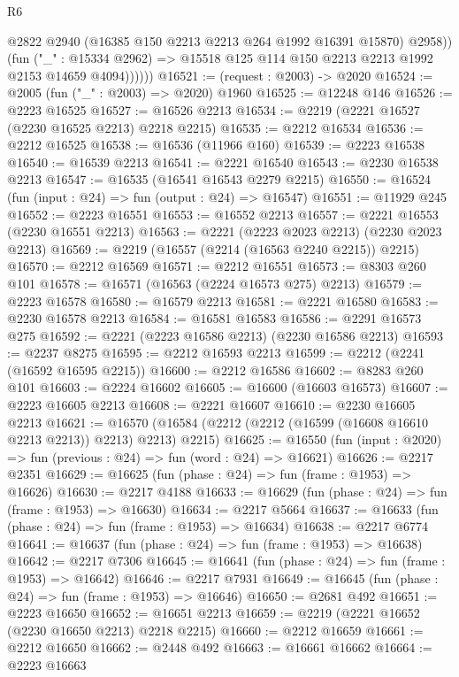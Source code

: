 \begin{lexlean}{R6}
\begin{coremodule}
                  @2822
                  @2940
                  (@16385 @150 @2213 @2213 @264 @1992 @16391 @15870)
                  @2958))
              (fun ("_" : @15334 @2962) =>
              @15518 @125 @114 @150 @2213 @2213 @1992 @2153 @14659 @4094))))))
@16521 := (request : @2003) -> @2020
@16524 := @2005 (fun ("_" : @2003) => @2020) @1960
@16525 := @12248 @146
@16526 := @2223 @16525
@16527 := @16526 @2213
@16534 := @2219 (@2221 @16527 (@2230 @16525 @2213) @2218 @2215)
@16535 := @2212 @16534
@16536 := @2212 @16525
@16538 := @16536 (@11966 @160)
@16539 := @2223 @16538
@16540 := @16539 @2213
@16541 := @2221 @16540
@16543 := @2230 @16538 @2213
@16547 := @16535 (@16541 @16543 @2279 @2215)
@16550 := @16524 (fun (input : @24) => fun (output : @24) => @16547)
@16551 := @11929 @245
@16552 := @2223 @16551
@16553 := @16552 @2213
@16557 := @2221 @16553 (@2230 @16551 @2213)
@16563 := @2221 (@2223 @2023 @2213) (@2230 @2023 @2213)
@16569 := @2219 (@16557 (@2214 (@16563 @2240 @2215)) @2215)
@16570 := @2212 @16569
@16571 := @2212 @16551
@16573 := @8303 @260 @101
@16578 := @16571 (@16563 (@2224 @16573 @275) @2213)
@16579 := @2223 @16578
@16580 := @16579 @2213
@16581 := @2221 @16580
@16583 := @2230 @16578 @2213
@16584 := @16581 @16583
@16586 := @2291 @16573 @275
@16592 := @2221 (@2223 @16586 @2213) (@2230 @16586 @2213)
@16593 := @2237 @8275
@16595 := @2212 @16593 @2213
@16599 := @2212 (@2241 (@16592 @16595 @2215))
@16600 := @2212 @16586
@16602 := @8283 @260 @101
@16603 := @2224 @16602
@16605 := @16600 (@16603 @16573)
@16607 := @2223 @16605 @2213
@16608 := @2221 @16607
@16610 := @2230 @16605 @2213
@16621 := @16570 (@16584 (@2212 (@2212 (@16599 (@16608 @16610 @2213 @2213)) @2213) @2213) @2215)
@16625 := @16550 (fun (input : @2020) => fun (previous : @24) => fun (word : @24) => @16621)
@16626 := @2217 @2351
@16629 := @16625 (fun (phase : @24) => fun (frame : @1953) => @16626)
@16630 := @2217 @4188
@16633 := @16629 (fun (phase : @24) => fun (frame : @1953) => @16630)
@16634 := @2217 @5664
@16637 := @16633 (fun (phase : @24) => fun (frame : @1953) => @16634)
@16638 := @2217 @6774
@16641 := @16637 (fun (phase : @24) => fun (frame : @1953) => @16638)
@16642 := @2217 @7306
@16645 := @16641 (fun (phase : @24) => fun (frame : @1953) => @16642)
@16646 := @2217 @7931
@16649 := @16645 (fun (phase : @24) => fun (frame : @1953) => @16646)
@16650 := @2681 @492
@16651 := @2223 @16650
@16652 := @16651 @2213
@16659 := @2219 (@2221 @16652 (@2230 @16650 @2213) @2218 @2215)
@16660 := @2212 @16659
@16661 := @2212 @16650
@16662 := @2448 @492
@16663 := @16661 @16662
@16664 := @2223 @16663

\end{coremodule}
\end{lexlean}
